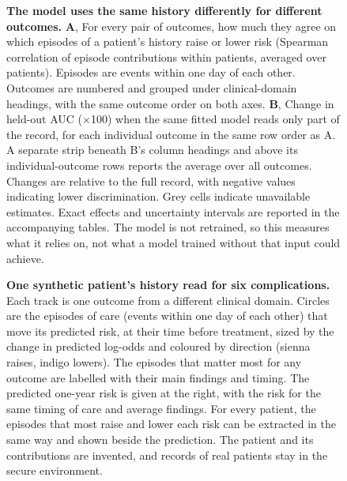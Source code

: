 \begin{figure}[p]
  \caption{\textbf{The model uses the same history differently for different
  outcomes.} \textbf{A}, For every pair of outcomes, how much they agree on which
  episodes of a patient's history raise or lower risk (Spearman correlation of
  episode contributions within patients, averaged over patients). Episodes are
  events within one day of each other. Outcomes are numbered and grouped under
  clinical-domain headings, with the same outcome order on both axes.
  \textbf{B}, Change in held-out AUC ($\times$100) when the same fitted model
  reads only part of the record, for each individual outcome in the same row
  order as A. A separate strip beneath B's column headings and above its
  individual-outcome rows reports the average over all outcomes.
  Changes are relative to the full record, with negative values indicating
  lower discrimination.
  Grey cells indicate unavailable estimates. Exact effects and uncertainty
  intervals are reported in the accompanying tables.
  The model is not retrained, so this measures what it
  relies on, not what a model trained without that input could achieve.}
  \label{fig:attribution-structure}
\end{figure}

\begin{figure}[p]
  \caption{\textbf{One synthetic patient's history read for six
  complications.} Each track is one outcome from a different clinical domain.
  Circles are the episodes of care (events within one day of each other) that
  move its predicted risk, at their time before treatment, sized by the change
  in predicted log-odds and coloured by direction (sienna raises, indigo
  lowers). The episodes that matter most for any outcome are labelled with
  their main findings and timing. The predicted one-year risk is given at the
  right, with the risk for the same timing of care and average findings. For
  every patient, the episodes that most raise and lower each risk can be
  extracted in the same way and shown beside the prediction. The patient and
  its contributions are invented, and records of real patients stay in the
  secure environment.}
  \label{fig:attribution-patient}
\end{figure}

